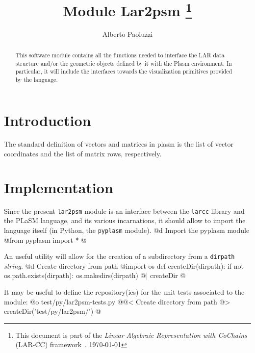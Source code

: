 \documentclass[11pt,oneside]{article}    %
\title{Module Lar2psm
\footnote{This document is part of the \emph{Linear Algebraic Representation with CoChains} (LAR-CC) framework~\cite{cclar-proj:2013:00}. \today}
}
\author{Alberto Paoluzzi}
\begin{document}
\maketitle

\begin{abstract}
This software module contains all the functions needed to interface the LAR data structure and/or the geometric  objects defined by it with the Plasm environment. In particular, it will include the interfaces towards the visualization primitives provided by the language.
\end{abstract}



\tableofcontents
\newpage

\section{Introduction}
The standard definition of vectors and matrices in plasm is the list of vector coordinates and the list of matrix rows, respectively.

\section{Implementation}

Since the present \texttt{lar2psm} module is an interface between the \texttt{larcc} library and the PLaSM language, and its various incarnations, it should allow to import the language itself (in Python, the \texttt{pyplasm} module). 
@d Import the pyplasm module
@{from pyplasm import * 
@}

An useful utility will allow for the creation of a subdirectory from a \texttt{dirpath} \emph{string}.
@d Create directory from path 
@{import os
def createDir(dirpath):
    if not os.path.exists(dirpath):
        os.makedirs(dirpath)
@| createDir @}

It may be useful to define the repository(ies) for the unit tests associated to the module:
@o test/py/lar2psm-tests.py
@{@< Create directory from path @>
createDir('test/py/lar2psm/')
@}
\end{document}
